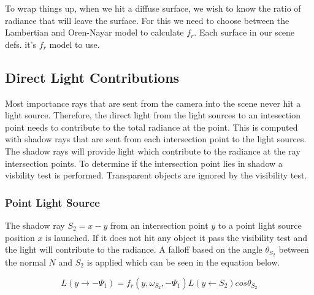 \documentclass[a4paper, twocolumn]{article}
\begin{document}
                To wrap things up, when we hit a diffuse surface, we wish to know the ratio of radiance that will leave the surface. For this we need to choose between the Lambertian and Oren-Nayar model to calculate \(f_r\). Each surface in our scene defs. it's \(f_r\) model to use.

        \subsection{Direct Light Contributions} \label{sec:direct_light_contributions}
        Most importance rays that are sent from the camera into the scene never hit a light source. Therefore, the direct light from the light sources to an intesection point needs to contribute to the total radiance at the point. This is computed with shadow rays that are sent from each intersection point to the light sources. The shadow rays will provide light which contribute to the radiance at the ray intersection points. To determine if the intersection point lies in shadow a visbility test is performed. Transparent objects are ignored by the visibility test.
            \subsubsection{Point Light Source} \label{sec:point_light_source}
            The shadow ray $S_2 = x - y$ from an intersection point $y$ to a point light source position $x$ is launched. If it does not hit any object it pass the visibility test and the light will contribute to the radiance. A falloff based on the angle $\theta_{S_2}$ between the normal $N$ and $S_2$ is applied which can be seen in the equation below.

            \begin{equation*}
              L(y \rightarrow -\Psi_1) = f_r(y, \omega_{S_2}, -\Psi_1) L(y \leftarrow S_2) cos\theta_{S_2}
            \end{equation*}
            
\end{document}
